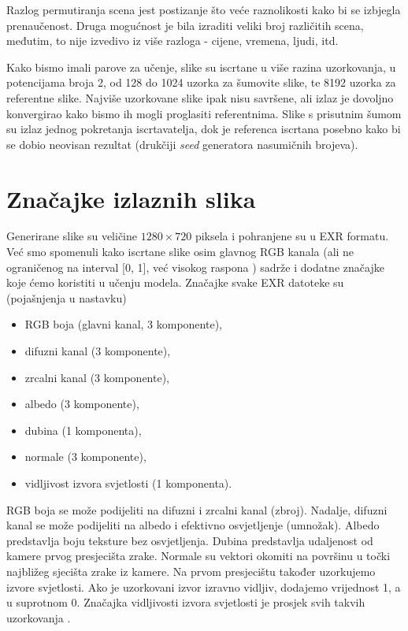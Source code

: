 \documentclass[times, utf8, seminar, numeric]{fer}
\begin{document}
Razlog permutiranja scena jest postizanje što veće raznolikosti kako bi se izbjegla prenaučenost.
Druga mogućnost je bila izraditi veliki broj različitih scena, međutim, to nije izvedivo iz više
razloga - cijene, vremena, ljudi, itd.

Kako bismo imali parove za učenje, slike su iscrtane u više razina uzorkovanja, u potencijama
broja 2, od 128 do 1024 uzorka za šumovite slike, te 8192 uzorka za referentne slike. Najviše
uzorkovane slike ipak nisu savršene, ali izlaz je dovoljno konvergirao kako bismo ih mogli
proglasiti referentnima. Slike s prisutnim šumom su izlaz jednog pokretanja iscrtavatelja, dok je
referenca iscrtana posebno kako bi se dobio neovisan rezultat (drukčiji \textit{seed} generatora
nasumičnih brojeva).

\section{Značajke izlaznih slika}
Generirane slike su veličine $1280\times720$ piksela i pohranjene su u EXR formatu. Već smo
spomenuli kako iscrtane slike osim glavnog RGB kanala (ali ne ograničenog na interval [0, 1], već
visokog raspona ) sadrže i dodatne značajke koje ćemo koristiti u
učenju modela. Značajke svake EXR datoteke su (pojašnjenja u nastavku)
\begin{itemize}
\item RGB boja (glavni kanal, 3 komponente),
\item difuzni kanal (3 komponente),
\item zrcalni kanal (3 komponente),
\item albedo (3 komponente),
\item dubina (1 komponenta),
\item normale (3 komponente),
\item vidljivost izvora svjetlosti (1 komponenta).
\end{itemize}

RGB boja se može podijeliti na difuzni i zrcalni kanal (zbroj). Nadalje, difuzni kanal se može
podijeliti na albedo i efektivno osvjetljenje (umnožak). Albedo predstavlja boju teksture bez
osvjetljenja. Dubina predstavlja udaljenost od kamere prvog presjecišta zrake. Normale su vektori
okomiti na površinu u točki najbližeg sjecišta zrake iz kamere. Na prvom presjecištu također
uzorkujemo izvore svjetlosti. Ako je uzorkovani izvor izravno vidljiv, dodajemo vrijednost 1,
a u suprotnom 0. Značajka vidljivosti izvora svjetlosti je prosjek svih takvih uzorkovanja
\cite{vogels2016thesis}.
\end{document}
